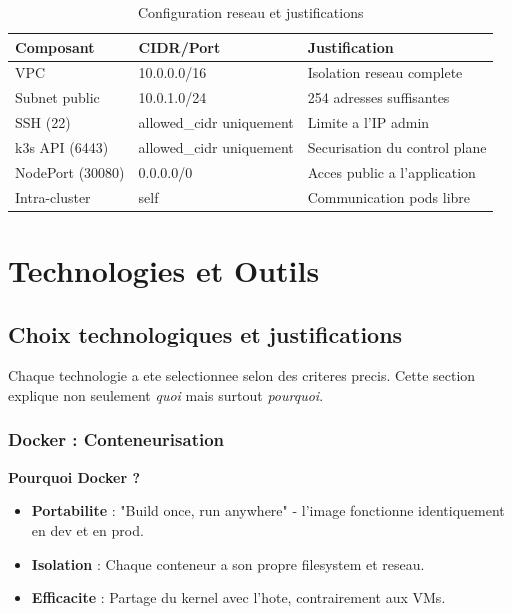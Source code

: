 \documentclass[12pt,a4paper,french]{report}
\begin{document}
\begin{table}[H]
    \centering
    \begin{tabular}{|l|l|l|}
        \hline
        \textbf{Composant} & \textbf{CIDR/Port} & \textbf{Justification} \\
        \hline
        VPC & 10.0.0.0/16 & Isolation reseau complete \\
        Subnet public & 10.0.1.0/24 & 254 adresses suffisantes \\
        SSH (22) & allowed\_cidr uniquement & Limite a l'IP admin \\
        k3s API (6443) & allowed\_cidr uniquement & Securisation du control plane \\
        NodePort (30080) & 0.0.0.0/0 & Acces public a l'application \\
        Intra-cluster & self & Communication pods libre \\
        \hline
    \end{tabular}
    \caption{Configuration reseau et justifications}
    \label{table:network}
\end{table}

\chapter{Technologies et Outils}

\section{Choix technologiques et justifications}

Chaque technologie a ete selectionnee selon des criteres precis. Cette section explique non seulement \textit{quoi} mais surtout \textit{pourquoi}.

\subsection{Docker : Conteneurisation}

\textbf{Pourquoi Docker ?}
\begin{itemize}
    \item \textbf{Portabilite} : "Build once, run anywhere" - l'image fonctionne identiquement en dev et en prod.
    \item \textbf{Isolation} : Chaque conteneur a son propre filesystem et reseau.
    \item \textbf{Efficacite} : Partage du kernel avec l'hote, contrairement aux VMs.
\end{itemize}
\end{document}

